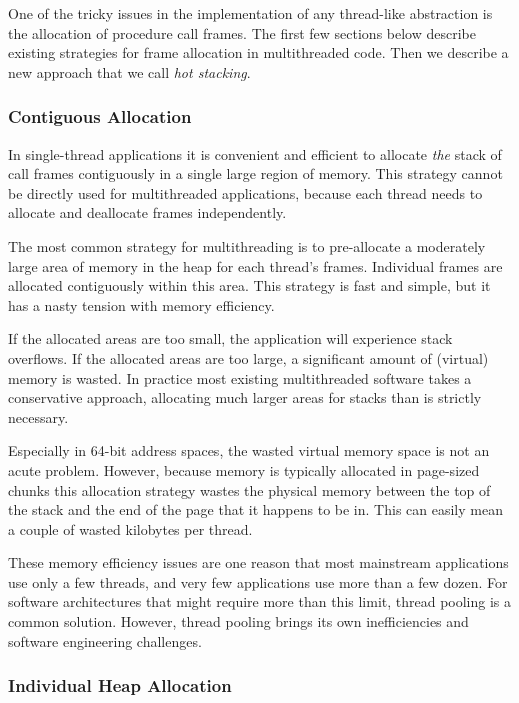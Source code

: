 \documentclass[9pt,preprint]{sigplanconf}
\begin{document}
One of the tricky issues in the implementation of any thread-like abstraction is the allocation of procedure call frames.
The first few sections below describe existing strategies for frame allocation in multithreaded code.
Then we describe a new approach that we call \emph{hot stacking}.

\subsubsection{Contiguous Allocation}

In single-thread applications it is convenient and efficient to allocate \emph{the} stack of call frames contiguously in a single large region of memory.
This strategy cannot be directly used for multithreaded applications, because each thread needs to allocate and deallocate frames independently.

The most common strategy for multithreading is to pre-allocate a moderately large area of memory in the heap for each thread's frames.
Individual frames are allocated contiguously within this area.
This strategy is fast and simple, but it has a nasty tension with memory efficiency.

If the allocated areas are too small, the application will experience stack overflows.
If the allocated areas are too large, a significant amount of (virtual) memory is wasted.
In practice most existing multithreaded software takes a conservative approach, allocating much larger areas for stacks than is strictly necessary.

Especially in 64-bit address spaces, the wasted virtual memory space is not an acute problem.
However, because memory is typically allocated in page-sized chunks this allocation strategy wastes the physical memory between the top of the stack and the end of the page that it happens to be in.
This can easily mean a couple of wasted kilobytes per thread.

These memory efficiency issues are one reason that most mainstream applications use only a few threads, and very few applications use more than a few dozen.
For software architectures that might require more than this limit, thread pooling is a common solution.
However, thread pooling brings its own inefficiencies and software engineering challenges.

\subsubsection{Individual Heap Allocation}
\end{document}
